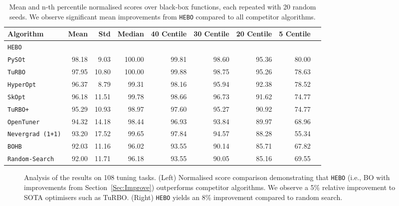 \documentclass[jair,twoside,11pt,theapa]{article}
\theoremstyle{definition}
\begin{document}
    \begin{table}[t!]
    \centering
\begin{tabular}{lrrrrrrrr}
\toprule
      Algorithm &    Mean &    Std &     Median &     40 Centile &    30 Centile &    20 Centile &  5 Centile \\
\midrule
          \texttt{HEBO} &   &    &   &   &   &   &   \\
          \texttt{PySOt} &   98.18 &   9.03 &  100.00 &   99.81 &  98.60 &  95.36 &  80.00 \\
          \texttt{TuRBO} &   97.95 &  10.80 &  100.00 &   99.88 &  98.75 &  95.26 &  78.63 \\
       \texttt{HyperOpt} &   96.37 &   8.79 &   99.31 &   98.16 &  95.94 &  92.38 &   78.52 \\
          \texttt{SkOpt} &   96.18 &  11.51 &   99.78 &   98.66 &  96.73 &  91.62 &  74.77 \\
\texttt{TuRBO+} &   95.29 &  10.93 &   98.97 &   97.60 &  95.27 &  90.92  &  74.77 \\
      \texttt{OpenTuner} &   94.32 &  14.18 &   98.44 &   96.93 &  93.84 &  89.97  &  68.96 \\
\texttt{Nevergrad (1+1)} &   93.20 &  17.52 &   99.65 &   97.84 &  94.57 &  88.28 &  55.34 \\
\texttt{BOHB} &   92.03 &  11.16  &  96.02 &  93.55 &  90.14  & 85.71   & 67.82 \\
  \texttt{Random-Search} &   92.00 &  11.71 &   96.18 &   93.55 &  90.05 &  85.16  &  69.55 \\
\bottomrule
\end{tabular}
    \caption{Mean and n-th percentile normalised scores over  black-box functions, each repeated with 20 random seeds. We observe significant mean improvements from \texttt{HEBO} compared to all competitor algorithms.
}
    \label{tab:summary-perf-compare}
\end{table}




\begin{figure*}\centering
{}\caption{Analysis of the results on 108 tuning tasks. (Left) Normalised score comparison demonstrating that \texttt{HEBO} (i.e., BO with improvements from Section~\ref{Sec:Improve}) outperforms competitor algorithms. We observe a 5\% relative improvement to SOTA optimisers such as TuRBO. (Right) \texttt{HEBO} yields an 8\% improvement compared to random search.}
\label{Fig:ResOne1}
\end{figure*}
\end{document}
